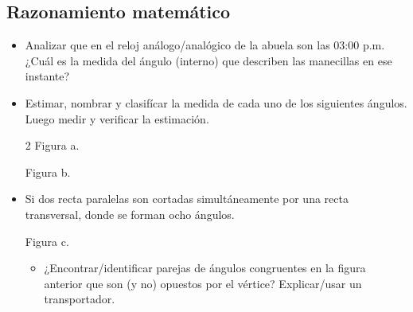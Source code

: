 \documentclass[11pt, twocolumn, landscape, a4paper]{article}
\begin{document}
\subsection*{Razonamiento matemático}
\begin{itemize}
\item{Analizar que en el reloj análogo/analógico de la abuela son las 03:00 p.m. ¿Cuál es la medida del ángulo (interno) que describen las manecillas en ese instante?}
\item{Estimar, nombrar y clasifícar la medida de cada uno de los siguientes ángulos. Luego medir y verificar la estimación.

\begin{multicols}{2}
{\scriptsize Figura a.}



{\scriptsize Figura b.}

\end{multicols}
}
\item{Si dos recta paralelas son cortadas simultáneamente por una recta transversal, donde se forman ocho ángulos.

{\scriptsize Figura c.}


\begin{itemize}
\item[$\circ$]{¿Encontrar/identificar parejas de ángulos congruentes en la figura anterior que son (y no) opuestos por el vértice? Explicar/usar un transportador.}

\end{itemize}
}
\end{itemize}
\end{document}

